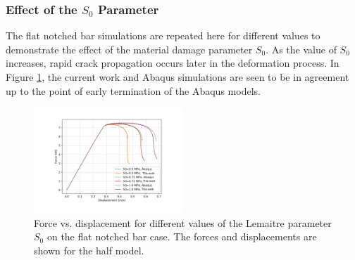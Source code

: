 \documentclass[sn-mathphys,Numbered]{sn-jnl}%
\begin{document}











\subsubsection{Effect of the $S_0$ Parameter}
The flat notched bar simulations are repeated here for different values to demonstrate the effect of the material damage parameter $S_0$.
As the value of $S_0$ increases, rapid crack propagation occurs later in the deformation process.
In Figure \ref{fig:vary_S0}, the current work and Abaqus simulations are seen to be in agreement up to the point of early termination of the Abaqus models.
\begin{figure}[htb]
\begin{center}
	\includegraphics[width=0.5\textwidth]{./Figures/LemaitreCompare/borden/lemaitreBordenCompare2}
\caption{Force vs. displacement for different values of the Lemaitre parameter $S_0$ on the flat notched bar case. The forces and displacements are shown for the half model.}
\label{fig:vary_S0}
\end{center}
\end{figure}
\end{document}
